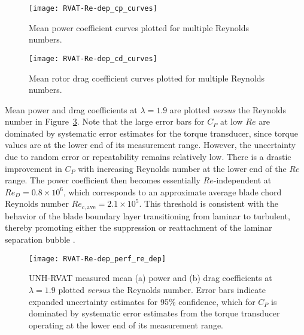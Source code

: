 \begin{figure}
    \centering
    
    \texttt{[image: RVAT-Re-dep\_cp\_curves]}
    
    \caption{Mean power coefficient curves plotted for multiple Reynolds numbers.}
    
    \label{fig:cp-curves}
\end{figure}

\begin{figure}
    \centering
    
    \texttt{[image: RVAT-Re-dep\_cd\_curves]}
    
    \caption{Mean rotor drag coefficient curves plotted for multiple Reynolds
        numbers.}
    
    \label{fig:cd-curves}
\end{figure}

Mean power and drag coefficients at $\lambda=1.9$ are plotted \textit{versus}
the Reynolds number in Figure~\ref{fig:perf-Re-dep}. Note that the large error
bars for $C_P$ at low $Re$ are dominated by systematic error estimates for the
torque transducer, since torque values are at the lower end of its measurement
range. However, the uncertainty due to random error or repeatability remains
relatively low. There is a drastic improvement in $C_P$ with increasing Reynolds
number at the lower end of the $Re$ range. The power coefficient then becomes
essentially $Re$-independent at $Re_D = 0.8 \times 10^6$, which corresponds to
an approximate average blade chord Reynolds number $Re_{c, \mathrm{ave}} = 2.1
\times 10^5$. This threshold is consistent with the behavior of the blade
boundary layer transitioning from laminar to turbulent, thereby promoting either
the suppression or reattachment of the laminar separation bubble
\cite{Lissaman1983}.


\begin{figure}
    \centering
    
    \texttt{[image: RVAT-Re-dep\_perf\_re\_dep]}
    
    \caption{UNH-RVAT measured mean (a) power and (b) drag coefficients at
        $\lambda=1.9$ plotted \textit{versus} the Reynolds number. Error bars indicate
        expanded uncertainty estimates for 95\% confidence, which for $C_P$ is dominated
        by systematic error estimates from the torque transducer operating at the lower
        end of its measurement range.}
    
    \label{fig:perf-Re-dep}
\end{figure}

